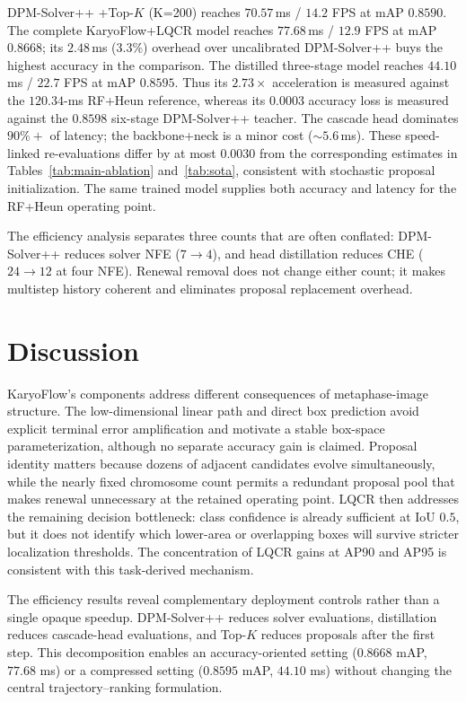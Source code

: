 \documentclass[journal,10pt]{IEEEtran}
\theoremstyle{definition}
\newcommand{\mAP}{\ensuremath{\mathrm{mAP}}}
\begin{document}
DPM-Solver++ +Top-$K$ (K=200) reaches $70.57$\,ms /
$14.2$ FPS at \mAP{} $0.8590$. The complete KaryoFlow+LQCR model reaches
$77.68$\,ms / $12.9$ FPS at \mAP{} $0.8668$; its $2.48$\,ms ($3.3\%$)
overhead over uncalibrated DPM-Solver++ buys the highest accuracy in the
comparison. The distilled three-stage model reaches $44.10$\,ms / $22.7$ FPS
at mAP $0.8595$. Thus its $2.73\times$ acceleration is measured against the
$120.34$-ms RF+Heun reference, whereas its $0.0003$ accuracy loss is measured
against the $0.8598$ six-stage DPM-Solver++ teacher. The cascade head dominates $90\%+$ of latency; the
backbone+neck is a minor cost ($\sim 5.6$\,ms). These speed-linked
re-evaluations differ by at most $0.0030$ from the corresponding estimates in
Tables~\ref{tab:main-ablation} and~\ref{tab:sota}, consistent with stochastic
proposal initialization. The same trained model supplies both accuracy and
latency for the RF+Heun operating point.

The efficiency analysis separates three counts that are often conflated:
DPM-Solver++ reduces solver NFE ($7\to4$), and head distillation reduces CHE
($24\to12$ at four NFE). Renewal removal does not change either count; it makes multistep
history coherent and eliminates proposal replacement overhead.

\section{Discussion}\label{sec:discussion}
KaryoFlow's components address different consequences of metaphase-image
structure. The low-dimensional linear path and direct box prediction avoid
explicit terminal error amplification and motivate a stable box-space
parameterization, although no separate accuracy gain is claimed. Proposal identity
matters because dozens of adjacent candidates evolve simultaneously, while the
nearly fixed chromosome count permits a redundant proposal pool that makes
renewal unnecessary at the retained operating point. LQCR then addresses the
remaining decision bottleneck: class confidence is already sufficient at IoU
$0.5$, but it does not identify which lower-area or overlapping boxes will survive
stricter localization thresholds. The concentration of LQCR gains at AP90 and
AP95 is consistent with this task-derived mechanism.

The efficiency results reveal complementary deployment controls rather than a
single opaque speedup. DPM-Solver++ reduces solver evaluations, distillation
reduces cascade-head evaluations, and Top-$K$ reduces proposals after the first
step. This decomposition enables an
accuracy-oriented setting ($0.8668$ mAP, $77.68$ ms) or a compressed setting
($0.8595$ mAP, $44.10$ ms) without changing the central trajectory--ranking
formulation.
\end{document}
